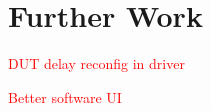 \chapter{Further Work}

\textcolor{red}{DUT delay reconfig in driver}

\textcolor{red}{Better software UI}
